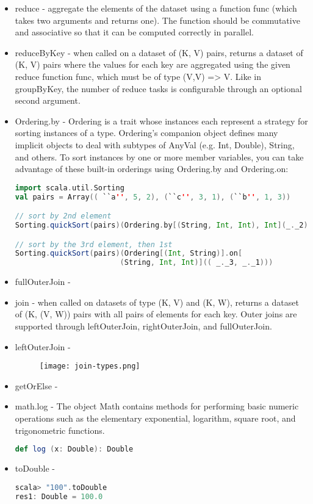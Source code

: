 \documentclass[paper=a4, fontsize=11pt]{scrartcl}
\numberwithin{equation}{section}		%
\numberwithin{figure}{section}			%
\numberwithin{table}{section}				%
\begin{document}
\begin{itemize}
\begin{lstlisting}
		\end{lstlisting}
	\item reduce - aggregate the elements of the dataset using a function func (which takes two arguments and returns one). The function should be commutative and associative so that it can be computed correctly in parallel.  
	\item reduceByKey - when called on a dataset of (K, V) pairs, returns a dataset of (K, V) pairs where the values for each key are aggregated using the given reduce function func, which must be of type (V,V) => V. Like in groupByKey, the number of reduce tasks is configurable through an optional second argument.  
	\item Ordering.by - Ordering is a trait whose instances each represent a strategy for sorting instances of a type. Ordering's companion object defines many implicit objects to deal with subtypes of AnyVal (e.g. Int, Double), String, and others. To sort instances by one or more member variables, you can take advantage of these built-in orderings using Ordering.by and Ordering.on:
		\begin{lstlisting}[language=scala]
import scala.util.Sorting
val pairs = Array(( ``a'', 5, 2), (``c'', 3, 1), (``b'', 1, 3))

// sort by 2nd element
Sorting.quickSort(pairs)(Ordering.by[(String, Int, Int), Int](_._2))

// sort by the 3rd element, then 1st
Sorting.quickSort(pairs)(Ordering[(Int, String)].on[
                        (String, Int, Int)](( _._3, _._1)))
		\end{lstlisting}

	\item fullOuterJoin - 
	\item join - when called on datasets of type (K, V) and (K, W), returns a dataset of (K, (V, W)) pairs with all pairs of elements for each key. Outer joins are supported through leftOuterJoin, rightOuterJoin, and fullOuterJoin. 
	\item leftOuterJoin -

		\begin{figure}[!htb]
			\texttt{[image: join-types.png]}
		\end{figure}

	\item getOrElse -  
	\item math.log - The object Math contains methods for performing basic numeric operations such as the elementary exponential, logarithm, square root, and trigonometric functions.  
\begin{lstlisting}[language=scala]
def log (x: Double): Double 
\end{lstlisting}
	\item toDouble -
\begin{lstlisting}[language=scala]
scala> "100".toDouble
res1: Double = 100.0


\end{lstlisting}
\end{itemize}
\end{document}
